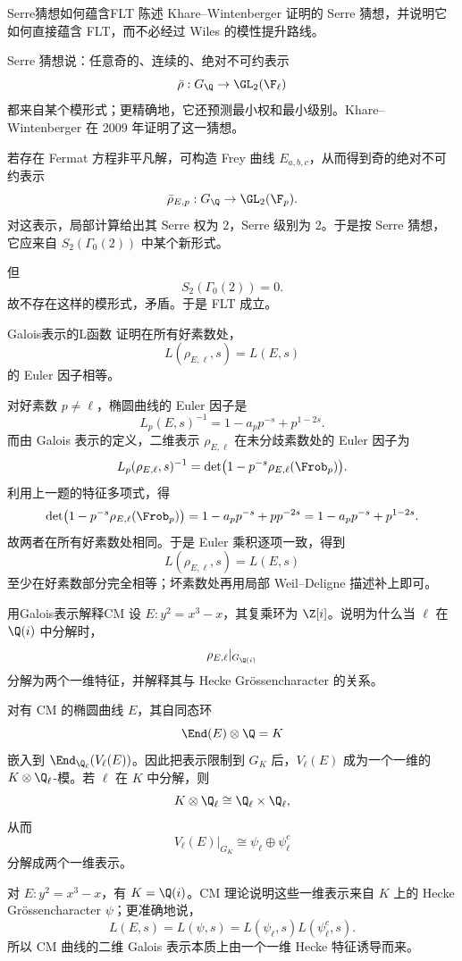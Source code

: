 \begin{problem}{Serre猜想如何蕴含FLT}
陈述 Khare--Wintenberger 证明的 Serre 猜想，并说明它如何直接蕴含 FLT，而不必经过 Wiles 的模性提升路线。
\end{problem}
\begin{solution}
Serre 猜想说：任意奇的、连续的、绝对不可约表示
\[
\bar\rho:G_\Q\to \GL_2(\F_\ell)
\]
都来自某个模形式；更精确地，它还预测最小权和最小级别。Khare--Wintenberger 在 2009 年证明了这一猜想。

若存在 Fermat 方程非平凡解，可构造 Frey 曲线 $E_{a,b,c}$，从而得到奇的绝对不可约表示
\[
\bar\rho_{E,p}:G_\Q\to \GL_2(\F_p).
\]
对这表示，局部计算给出其 Serre 权为 $2$，Serre 级别为 $2$。于是按 Serre 猜想，它应来自 $S_2(\Gamma_0(2))$ 中某个新形式。

但
\[
S_2(\Gamma_0(2))=0.
\]
故不存在这样的模形式，矛盾。于是 FLT 成立。
\end{solution}

\begin{problem}{Galois表示的L函数}
证明在所有好素数处，
\[
L(\rho_{E,\ell},s)=L(E,s)
\]
的 Euler 因子相等。
\end{problem}
\begin{solution}
对好素数 $p\neq \ell$，椭圆曲线的 Euler 因子是
\[
L_p(E,s)^{-1}=1-a_pp^{-s}+p^{1-2s}.
\]
而由 Galois 表示的定义，二维表示 $\rho_{E,\ell}$ 在未分歧素数处的 Euler 因子为
\[
L_p(\rho_{E,\ell},s)^{-1}=\det\bigl(1-p^{-s}\rho_{E,\ell}(\Frob_p)\bigr).
\]
利用上一题的特征多项式，得
\[
\det\bigl(1-p^{-s}\rho_{E,\ell}(\Frob_p)\bigr)=1-a_pp^{-s}+pp^{-2s}=1-a_pp^{-s}+p^{1-2s}.
\]
故两者在所有好素数处相同。于是 Euler 乘积逐项一致，得到
\[
L(\rho_{E,\ell},s)=L(E,s)
\]
至少在好素数部分完全相等；坏素数处再用局部 Weil--Deligne 描述补上即可。
\end{solution}

\begin{problem}{用Galois表示解释CM}
设 $E:y^2=x^3-x$，其复乘环为 $\Z[i]$。说明为什么当 $\ell$ 在 $\Q(i)$ 中分解时，
\[
\rho_{E,\ell}|_{G_{\Q(i)}}
\]
分解为两个一维特征，并解释其与 Hecke Grössencharacter 的关系。
\end{problem}
\begin{solution}
对有 CM 的椭圆曲线 $E$，其自同态环
\[
\End(E)\otimes\Q=K
\]
嵌入到 $\End_{\Q_\ell}(V_\ell(E))$。因此把表示限制到 $G_K$ 后，$V_\ell(E)$ 成为一个一维的 $K\otimes\Q_\ell$-模。若 $\ell$ 在 $K$ 中分解，则
\[
K\otimes\Q_\ell\cong \Q_\ell\times \Q_\ell,
\]
从而
\[
V_\ell(E)|_{G_K}\cong \psi_\ell\oplus \psi_\ell^c
\]
分解成两个一维表示。

对 $E:y^2=x^3-x$，有 $K=\Q(i)$。CM 理论说明这些一维表示来自 $K$ 上的 Hecke Grössencharacter $\psi$；更准确地说，
\[
L(E,s)=L(\psi,s)=L(\psi_\ell,s)L(\psi_\ell^c,s).
\]
所以 CM 曲线的二维 Galois 表示本质上由一个一维 Hecke 特征诱导而来。
\end{solution}


